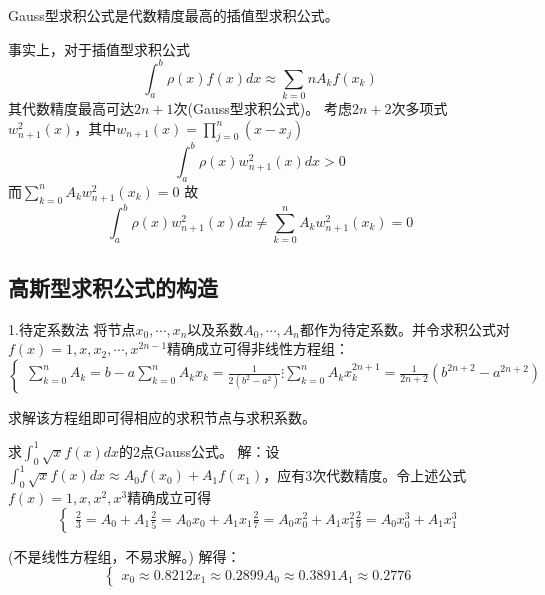 \begin{remark}
    Gauss型求积公式是代数精度最高的插值型求积公式。
\end{remark}

事实上，对于插值型求积公式
\begin{equation*}
    \int_{a}^{b}\rho(x)f(x)dx\approx \sum_{k=0}{n}A_kf(x_k)
\end{equation*}
其代数精度最高可达$2n+1$次(Gauss型求积公式)。
考虑$2n+2$次多项式$w_{n+1}^2(x)$，其中$w_{n+1}(x) = \prod_{j=0}^{n}(x-x_j)$
\begin{equation*}
    \int_{a}^{b}\rho(x)w_{n+1}^2(x)dx > 0
\end{equation*}
而$\sum_{k=0}^{n}A_kw^2_{n+1}(x_k) = 0$
故
\begin{equation*}
    \int_{a}^{b}\rho(x)w_{n+1}^2(x)dx \neq \sum_{k=0}^{n}A_kw^2_{n+1}(x_k) = 0
\end{equation*}

\subsection{高斯型求积公式的构造}

1.待定系数法
将节点$x_0,\cdots,x_n$以及系数$A_0,\cdots,A_n$都作为待定系数。并令求积公式对$f(x) = 1,x,x_2,\cdots,x^{2n-1}$精确成立可得非线性方程组：
\begin{equation*}
    \begin{cases}
        \sum_{k=0}^{n}A_k = b-a
        \sum_{k=0}^{n}A_kx_k = \frac{1}{2(b^2-a^2)}
        \vdots 
        \sum_{k=0}^{n}A_kx_k^{2n+1} = \frac{1}{2n+2}(b^{2n+2}-a^{2n+2})
    \end{cases}
\end{equation*}

求解该方程组即可得相应的求积节点与求积系数。
\begin{example}
    求$\int_{0}^{1}\sqrt{x}f(x)dx$的2点Gauss公式。
    解：设$\int_{0}^{1}\sqrt{x}f(x)dx \approx A_0f(x_0)+A_1f(x_1)$，应有3次代数精度。令上述公式$f(x) = 1,x,x^2,x^3$精确成立可得
    \begin{equation*}
        \begin{cases}
            \frac{2}{3} = A_0 + A_1
            \frac{2}{5} = A_0x_0 + A_1x_1
            \frac{2}{7} = A_0x_0^2 + A_1x_1^2
            \frac{2}{9} = A_0x_0^3 + A_1x_1^3
        \end{cases}
    \end{equation*}
    
    (不是线性方程组，不易求解。)
    解得：
    \begin{equation*}
        \begin{cases}
            x_0 \approx 0.8212
            x_1 \approx 0.2899
            A_0 \approx 0.3891
            A_1 \approx 0.2776
        \end{cases}
    \end{equation*}
    
\end{example}


